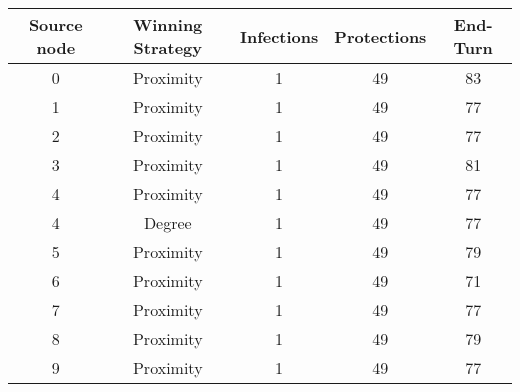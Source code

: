 \documentclass[results.tex]{subfiles}
\begin{document}
    \begin{center}
        \begin{tabular}{| c || c | c | c | c |}
            \hline
            {\bfseries Source node} & {\bfseries Winning Strategy} & {\bfseries Infections} & {\bfseries Protections}
            & {\bfseries End-Turn}
            \\  %
            \hline\hline
            0                       & Proximity                    & 1                      & 49                      & 83                   \\
            \hline
            1                       & Proximity                    & 1                      & 49                      & 77                   \\
            \hline
            2                       & Proximity                    & 1                      & 49                      & 77                   \\
            \hline
            3                       & Proximity                    & 1                      & 49                      & 81                   \\
            \hline
            4                       & Proximity                    & 1                      & 49                      & 77                   \\
            \hline
            4                       & Degree                       & 1                      & 49                      & 77                   \\
            \hline
            5                       & Proximity                    & 1                      & 49                      & 79                   \\
            \hline
            6                       & Proximity                    & 1                      & 49                      & 71                   \\
            \hline
            7                       & Proximity                    & 1                      & 49                      & 77                   \\
            \hline
            8                       & Proximity                    & 1                      & 49                      & 79                   \\
            \hline
            9                       & Proximity                    & 1                      & 49                      & 77                   \\

\end{tabular}
\end{center}
\end{document}
